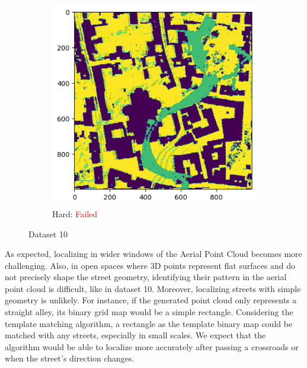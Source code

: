 \documentclass[11pt]{article}
\begin{document}
\begin{figure}[p]
        \vspace{1em}

        \begin{subfigure}{0.45\textwidth}
            \centering
            \includegraphics[width=\linewidth]{images/full/hard/5_2_3_hard}
            \caption{Hard: \textcolor{red}{Failed}}
            \label{fig:5_2_3_hard}
        \end{subfigure}
        \hfill

        \caption{Dataset 10}
        \label{fig:res_5_2_3}
    \end{figure}

    \clearpage

    As expected, localizing in wider windows of the Aerial Point Cloud becomes more challenging. Also, in open spaces
    where 3D points represent flat surfaces and do not precisely shape the street geometry, identifying their pattern
    in the aerial point cloud is difficult, like in dataset 10. Moreover, localizing streets with simple
    geometry is unlikely. For instance, if the generated point cloud only represents a straight alley, its binary
    grid map would be a simple rectangle. Considering the template matching algorithm,
    a rectangle as the template binary map could be matched with any streets, especially in small scales.
    We expect that the algorithm would be able to localize more accurately after passing a crossroads or when the street's direction changes.
\end{document}
